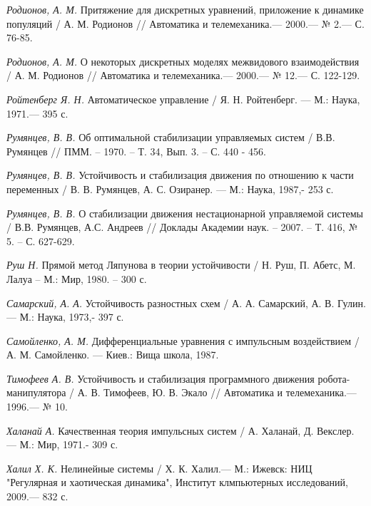 \begin{thebibliography}{10}
	
	{\it Родионов, А. М.} Притяжение для дискретных уравнений, приложение к динамике популяций
	/ А. М. Родионов // Автоматика и телемеханика.— 2000.— № 2.— С. 76-85.
	
	{\it Родионов, А. М.} О некоторых дискретных моделях межвидового взаимодействия
	/ А. М. Родионов // Автоматика и телемеханика.— 2000.— № 12.— С. 122-129.
	
	{\it Ройтенберг Я. Н.} Автоматическое управление /
	Я. Н. Ройтенберг. — М.: Наука, 1971.— 395 с.
	
	{\it Румянцев, В. В.} Об оптимальной стабилизации управляемых систем / В.В. Румянцев // ПММ. – 1970. – Т. 34, Вып. 3. – С. 440 - 456.
	
	{\it Румянцев, В. В.} Устойчивость и стабилизация движения по отношению к части переменных /
	В. В. Румянцев, А. С. Озиранер. — М.: Наука, 1987,- 253 с.
	
	{\it Румянцев, В. В.} О стабилизации движения нестационарной управляемой системы / В.В. Румянцев, А.С. Андреев // Доклады Академии наук. – 2007. – Т. 416, № 5. – С. 627-629.
	
	{\it Руш Н.} Прямой метод Ляпунова в теории устойчивости / Н. Руш, П. Абетс, М. Лалуа – М.: Мир, 1980. – 300 с.
	
	{\it Самарский, А. А.} Устойчивость разностных схем /
	А. А. Самарский, А. В. Гулин. — М.: Наука, 1973,- 397 с.
	
	{\it Самойленко, А. М.} Дифференциальные уравнения с импульсным воздействием /
	А. М. Самойленко. — Киев.: Вища школа, 1987.
	
	{\it Тимофеев А. В.} Устойчивость и стабилизация программного движения робота-манипулятора /
	А. В. Тимофеев, Ю. В. Экало // Автоматика и телемеханика.— 1996.— № 10.
	
	{\it Халанай А.} Качественная теория импульсных систем /
	А. Халанай, Д. Векслер. — М.: Мир, 1971.- 309 с.
	
	{\it Халил Х. К.} Нелинейные системы / Х. К. Халил.— М.: Ижевск: НИЦ "Регулярная и хаотическая динамика", Институт клмпьютерных исследований, 2009.— 832 с.
	

\end{thebibliography}

